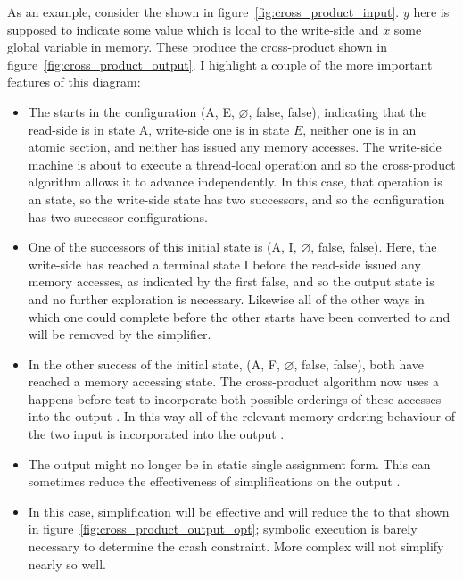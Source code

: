 As an example, consider the {\StateMachines} shown in
figure~\ref{fig:cross_product_input}.  $y$ here is supposed to
indicate some value which is local to the write-side {\StateMachine}
and $x$ some global variable in memory.  These produce the
cross-product {\StateMachine} shown in
figure~\ref{fig:cross_product_output}.  I highlight a couple of the more important
features of this diagram:

\begin{itemize}
\item The {\StateMachine} starts in the configuration (A, E,
  $\varnothing$, false, false), indicating that the read-side
  {\StateMachine} is in state A, write-side one is in state $E$,
  neither one is in an atomic section, and neither has issued any
  memory accesses.  The write-side machine is about to execute a
  thread-local operation and so the cross-product algorithm allows it
  to advance independently.  In this case, that operation is an
   state, so the write-side state has two successors, and so
  the configuration has two successor configurations.
\item One of the successors of this initial state is (A, I,
  $\varnothing$, false, false).  Here, the write-side {\StateMachine}
  has reached a terminal state I before the read-side {\StateMachine}
  issued any memory accesses, as indicated by the first false, and so
  the output state is  and no further exploration is
  necessary.  Likewise all of the other ways in which one
  {\StateMachine} could complete before the other starts have been
  converted to  and will be removed by the
  simplifier.
\item In the other success of the initial state, (A, F, $\varnothing$,
  false, false), both {\StateMachines} have reached a memory accessing
  state.  The cross-product algorithm now uses a happens-before test
  to incorporate both possible orderings of these accesses into the
  output {\StateMachine}.  In this way all of the relevant memory
  ordering behaviour of the two input {\StateMachines} is incorporated
  into the output {\StateMachine}.
\item The output {\StateMachine} might no longer be in static single
  assignment form.  This can sometimes reduce the effectiveness of
  {\StateMachine} simplifications on the output {\StateMachine}.


\item In this case, simplification will be effective and will reduce
  the {\StateMachine} to that shown in
  figure~\ref{fig:cross_product_output_opt}; symbolic execution is
  barely necessary to determine the crash constraint.  More complex
  {\StateMachines} will not simplify nearly so well. 
\end{itemize}

